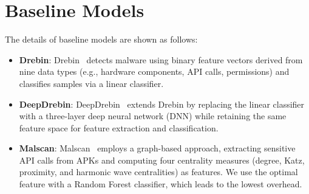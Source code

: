 \section{Baseline Models}
\label{baseline}
\noindent The details of baseline models are shown as follows:
\begin{itemize}
    \item \textbf{Drebin}: Drebin~\cite{Arpdrebin} detects malware using binary feature vectors derived from nine data types (e.g., hardware components, API calls, permissions) and classifies samples via a linear classifier. 
    \item \textbf{DeepDrebin}: DeepDrebin~\cite{Grossedeepdrebin} extends Drebin by replacing the linear classifier with a three-layer deep neural network (DNN) while retaining the same feature space for feature extraction and classification.
    \item \textbf{Malscan}: Malscan~\cite{malscan} employs a graph-based approach, extracting sensitive API calls from APKs and computing four centrality measures (degree, Katz, proximity, and harmonic wave centralities) as features. We use the optimal feature with a Random Forest classifier, which leads to the lowest overhead.
\end{itemize}
